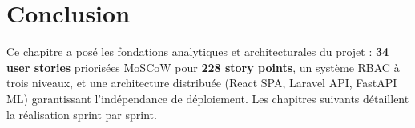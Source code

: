 \section{Conclusion}

\begin{chapconclusion}
Ce chapitre a posé les fondations analytiques et architecturales du projet :
\textbf{34 user stories} priorisées MoSCoW pour \textbf{228 story points},
un système RBAC à trois niveaux, et une architecture distribuée (React SPA,
Laravel API, FastAPI ML) garantissant l'indépendance de déploiement.
Les chapitres suivants détaillent la réalisation sprint par sprint.
\end{chapconclusion}
